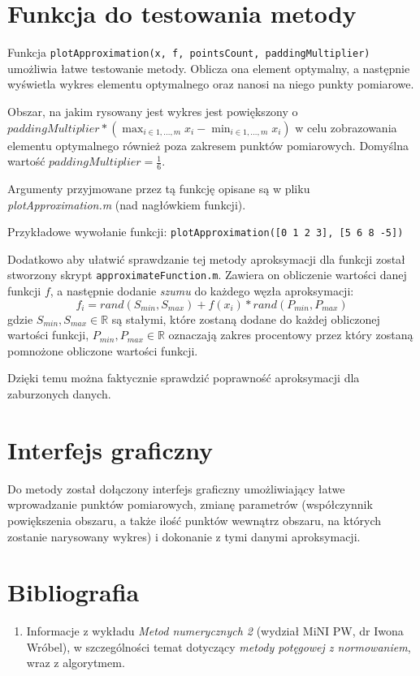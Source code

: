 \documentclass[12pt]{article}
\begin{document}
	
	
	\section{Funkcja do testowania metody}
	Funkcja \texttt{plotApproximation(x, f, pointsCount, paddingMultiplier)} umożliwia łatwe testowanie metody. Oblicza ona element optymalny, a następnie wyświetla wykres elementu optymalnego oraz nanosi na niego punkty pomiarowe.
	
	Obszar, na jakim rysowany jest wykres jest powiększony o $paddingMultiplier * (\max_{i \in {1, \dots, m}} x_i - \min_{i \in {1, \dots, m}} x_i)$ w celu zobrazowania elementu optymalnego również poza zakresem punktów pomiarowych. Domyślna wartość $paddingMultiplier = \frac{1}{6}$.
	
	Argumenty przyjmowane przez tą funkcję opisane są w pliku \textit{plotApproximation.m} (nad nagłówkiem funkcji).
	
	Przykładowe wywołanie funkcji:
	\texttt{plotApproximation([0 1 2 3], [5 6 8 -5])}
	
	Dodatkowo aby ułatwić sprawdzanie tej metody aproksymacji dla funkcji został stworzony skrypt \texttt{approximateFunction.m}. Zawiera on obliczenie wartości danej funkcji $f$, a następnie dodanie \textit{szumu} do każdego węzła aproksymacji:
	$$
	f_i = rand(S_{min}, S_{max}) +  f(x_i) * rand(P_{min}, P_{max})
	$$
	gdzie $S_{min}, S_{max} \in \mathbb{R}$ są stałymi, które zostaną dodane do każdej obliczonej wartości funkcji, $P_{min}, P_{max} \in \mathbb{R}$ oznaczają zakres procentowy przez który zostaną pomnożone obliczone wartości funkcji.
	
	Dzięki temu można faktycznie sprawdzić poprawność aproksymacji dla zaburzonych danych.
	
	
	\section{Interfejs graficzny}
	Do metody został dołączony interfejs graficzny umożliwiający łatwe wprowadzanie punktów pomiarowych, zmianę parametrów (współczynnik powiększenia obszaru, a także ilość punktów wewnątrz obszaru, na których zostanie narysowany wykres) i dokonanie z tymi danymi aproksymacji.
	
	
	
	\section{Bibliografia}
	\begin{enumerate}
		\item Informacje z wykładu \textit{Metod numerycznych 2} (wydział MiNI PW, dr Iwona Wróbel), w szczególności temat dotyczący \textit{metody potęgowej z normowaniem}, wraz z algorytmem.
	\end{enumerate}
	
\end{document}
